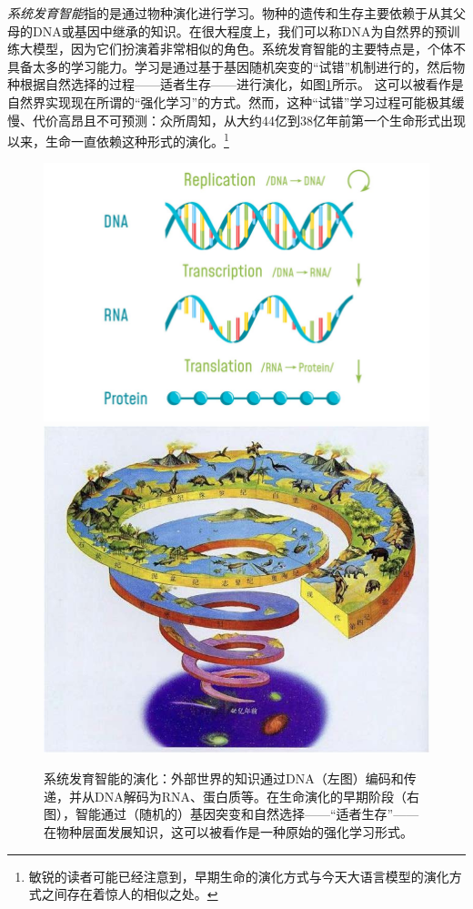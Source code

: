 \documentclass[../../book-main.tex]{subfiles}
\begin{document}
{\em 系统发育智能}指的是通过物种演化进行学习。物种的遗传和生存主要依赖于从其父母的DNA或基因中继承的知识。在很大程度上，我们可以称DNA为自然界的预训练大模型，因为它们扮演着非常相似的角色。系统发育智能的主要特点是，个体不具备太多的学习能力。学习是通过基于基因随机突变的“试错”机制进行的，然后物种根据自然选择的过程——适者生存——进行演化，如图\ref{fig:phylogenetic}所示。
这可以被看作是自然界实现现在所谓的“强化学习”的方式。然而，这种“试错”学习过程可能极其缓慢、代价高昂且不可预测：众所周知，从大约44亿到38亿年前第一个生命形式出现以来，生命一直依赖这种形式的演化。\footnote{敏锐的读者可能已经注意到，早期生命的演化方式与今天大语言模型的演化方式之间存在着惊人的相似之处。} 
\begin{figure}
    \centering
\includegraphics[width=0.5\linewidth]{figs_chap1/DNAs.png}
\includegraphics[width=0.40\linewidth]{figs_chap1/Evolution.jpg}
    \caption{系统发育智能的演化：外部世界的知识通过DNA（左图）编码和传递，并从DNA解码为RNA、蛋白质等。在生命演化的早期阶段（右图），智能通过（随机的）基因突变和自然选择——“适者生存”——在物种层面发展知识，这可以被看作是一种原始的强化学习形式。}
    \label{fig:phylogenetic}
\end{figure}
\end{document}
